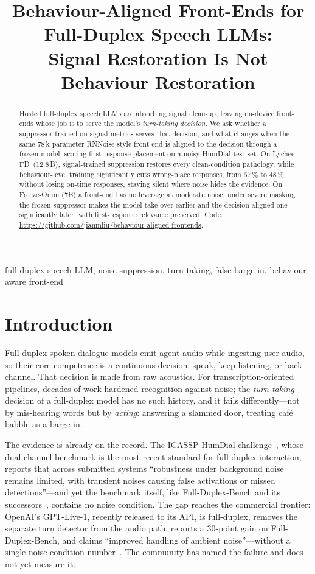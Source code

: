 \documentclass{article}
\title{Behaviour-Aligned Front-Ends for Full-Duplex Speech LLMs:\\ Signal Restoration Is Not Behaviour Restoration}
\newcommand{\lfd}{Lychee-FD}
\begin{document}
\maketitle

\begin{abstract}
Hosted full-duplex speech LLMs are absorbing signal clean-up, leaving on-device front-ends whose job is
to serve the model's \emph{turn-taking decision}. We ask whether a suppressor trained on signal metrics
serves that decision, and what changes when the same 78\,k-parameter RNNoise-style front-end is aligned
to the decision through a frozen model, scoring first-response placement on a noisy HumDial test set. On \lfd\ (12.8\,B), signal-trained suppression restores every
clean-condition pathology, while behaviour-level training significantly cuts wrong-place responses, from 67\,\% to
48\,\%, without losing on-time responses, staying silent where noise hides the evidence.
On Freeze-Omni (7B) a front-end has no leverage at moderate noise; under severe masking the frozen
suppressor makes the model take over earlier and the decision-aligned one significantly later, with
first-response relevance preserved.
Code: \url{https://github.com/jianmliu/behaviour-aligned-frontends}.
\end{abstract}
\begin{keywords}
full-duplex speech LLM, noise suppression, turn-taking, false barge-in, behaviour-aware front-end
\end{keywords}

\section{Introduction}
\label{sec:intro}
Full-duplex spoken dialogue models emit agent audio while ingesting user audio, so their core
competence is a continuous decision: speak, keep listening, or back-channel. That decision is made
from raw acoustics. For transcription-oriented pipelines, decades of work hardened recognition
against noise; the \emph{turn-taking} decision of a full-duplex model has no such history, and it
fails differently---not by mis-hearing words but by \emph{acting}: answering a slammed door,
treating caf\'e babble as a barge-in.

The evidence is already on the record. The ICASSP HumDial challenge~\cite{humdial2026}, whose
dual-channel benchmark is the most recent standard for full-duplex interaction, reports that
across submitted systems ``robustness under background noise remains limited, with transient
noises causing false activations or missed detections''---and yet the benchmark itself, like
Full-Duplex-Bench and its successors~\cite{lin2025fdb,lin2025fdb15,fdbv3}, contains no noise
condition. The gap reaches the commercial frontier: OpenAI's GPT-Live-1, recently released to its API,
is full-duplex, removes the separate turn detector from the audio path, reports a
30-point gain on Full-Duplex-Bench, and claims ``improved handling of ambient noise''---without a
single noise-condition number~\cite{gptlive2026}. The community has named the failure and does
not yet measure it.
\end{document}
